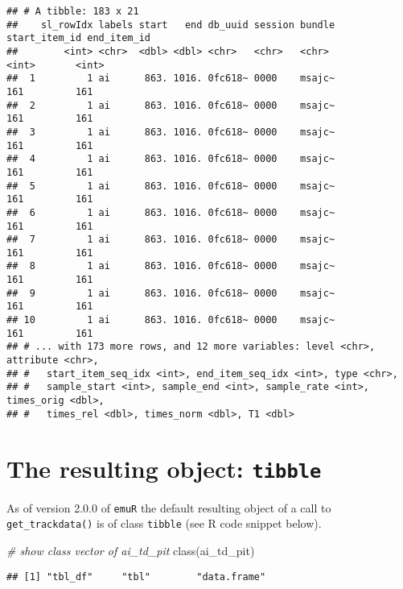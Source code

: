 \documentclass[
]{book}
\newenvironment{Shaded}{\begin{snugshade}}{\end{snugshade}}
\newcommand{\CommentTok}[1]{\textcolor[rgb]{0.56,0.35,0.01}{\textit{#1}}}
\newcommand{\FunctionTok}[1]{\textcolor[rgb]{0.00,0.00,0.00}{#1}}
\newcommand{\NormalTok}[1]{#1}
\begin{document}
\begin{verbatim}
## # A tibble: 183 x 21
##    sl_rowIdx labels start   end db_uuid session bundle start_item_id end_item_id
##        <int> <chr>  <dbl> <dbl> <chr>   <chr>   <chr>          <int>       <int>
##  1         1 ai      863. 1016. 0fc618~ 0000    msajc~           161         161
##  2         1 ai      863. 1016. 0fc618~ 0000    msajc~           161         161
##  3         1 ai      863. 1016. 0fc618~ 0000    msajc~           161         161
##  4         1 ai      863. 1016. 0fc618~ 0000    msajc~           161         161
##  5         1 ai      863. 1016. 0fc618~ 0000    msajc~           161         161
##  6         1 ai      863. 1016. 0fc618~ 0000    msajc~           161         161
##  7         1 ai      863. 1016. 0fc618~ 0000    msajc~           161         161
##  8         1 ai      863. 1016. 0fc618~ 0000    msajc~           161         161
##  9         1 ai      863. 1016. 0fc618~ 0000    msajc~           161         161
## 10         1 ai      863. 1016. 0fc618~ 0000    msajc~           161         161
## # ... with 173 more rows, and 12 more variables: level <chr>, attribute <chr>,
## #   start_item_seq_idx <int>, end_item_seq_idx <int>, type <chr>,
## #   sample_start <int>, sample_end <int>, sample_rate <int>, times_orig <dbl>,
## #   times_rel <dbl>, times_norm <dbl>, T1 <dbl>
\end{verbatim}

\hypertarget{the-resulting-object-tibble}{%
\section{\texorpdfstring{The resulting object: \texttt{tibble}}{The resulting object: tibble}}\label{the-resulting-object-tibble}}

As of version 2.0.0 of \texttt{emuR} the default resulting object of a call to \texttt{get\_trackdata()} is of class \texttt{tibble} (see R code snippet below).

\begin{Shaded}
\begin{Highlighting}[]
\CommentTok{\# show class vector of ai\_td\_pit}
\FunctionTok{class}\NormalTok{(ai\_td\_pit)}
\end{Highlighting}
\end{Shaded}

\begin{verbatim}
## [1] "tbl_df"     "tbl"        "data.frame"
\end{verbatim}
\end{document}
